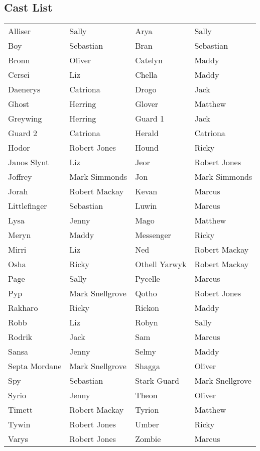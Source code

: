 \subsection*{Cast List}
\begin{tabular}{ll|ll}\\
Alliser & Sally &  Arya & Sally\\
Boy & Sebastian &  Bran & Sebastian\\
Bronn & Oliver &  Catelyn & Maddy\\
Cersei & Liz &  Chella & Maddy\\
Daenerys & Catriona &  Drogo & Jack\\
Ghost & Herring &  Glover & Matthew\\
Greywing & Herring &  Guard 1 & Jack\\
Guard 2 & Catriona &  Herald & Catriona\\
Hodor & Robert Jones &  Hound & Ricky\\
Janos Slynt & Liz &  Jeor & Robert Jones\\
Joffrey & Mark Simmonds &  Jon & Mark Simmonds\\
Jorah & Robert Mackay &  Kevan & Marcus\\
Littlefinger & Sebastian &  Luwin & Marcus\\
Lysa & Jenny &  Mago & Matthew\\
Meryn & Maddy &  Messenger & Ricky\\
Mirri & Liz &  Ned & Robert Mackay\\
Osha & Ricky &  Othell Yarwyk & Robert Mackay\\
Page & Sally &  Pycelle & Marcus\\
Pyp & Mark Snellgrove &  Qotho & Robert Jones\\
Rakharo & Ricky &  Rickon & Maddy\\
Robb & Liz &  Robyn & Sally\\
Rodrik & Jack &  Sam & Marcus\\
Sansa & Jenny &  Selmy & Maddy\\
Septa Mordane & Mark Snellgrove &  Shagga & Oliver\\
Spy & Sebastian &  Stark Guard & Mark Snellgrove\\
Syrio & Jenny &  Theon & Oliver\\
Timett & Robert Mackay &  Tyrion & Matthew\\
Tywin & Robert Jones &  Umber & Ricky\\
Varys & Robert Jones &  Zombie & Marcus\\
\end{tabular}
